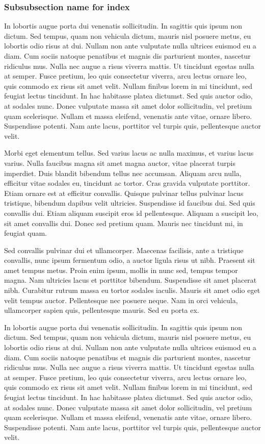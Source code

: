 \subsubsection[Subsubsection name]{Subsubsection name for index}
In lobortis augue porta dui venenatis sollicitudin. In sagittis quis ipsum non dictum. Sed tempus, quam non vehicula dictum, mauris nisl posuere metus, eu lobortis odio risus at dui. Nullam non ante vulputate nulla ultrices euismod eu a diam. Cum sociis natoque penatibus et magnis dis parturient montes, nascetur ridiculus mus. Nulla nec augue a risus viverra mattis. Ut tincidunt egestas nulla at semper. Fusce pretium, leo quis consectetur viverra, arcu lectus ornare leo, quis commodo ex risus sit amet velit. Nullam finibus lorem in mi tincidunt, sed feugiat lectus tincidunt. In hac habitasse platea dictumst. Sed quis auctor odio, at sodales nunc. Donec vulputate massa sit amet dolor sollicitudin, vel pretium quam scelerisque. Nullam et massa eleifend, venenatis ante vitae, ornare libero. Suspendisse potenti. Nam ante lacus, porttitor vel turpis quis, pellentesque auctor velit.

Morbi eget elementum tellus. Sed varius lacus ac nulla maximus, et varius lacus varius. Nulla faucibus magna sit amet magna auctor, vitae placerat turpis imperdiet. Duis blandit bibendum tellus nec accumsan. Aliquam arcu nulla, efficitur vitae sodales eu, tincidunt ac tortor. Cras gravida vulputate porttitor. Etiam ornare est at efficitur convallis. Quisque pulvinar tellus pulvinar lacus tristique, bibendum dapibus velit ultricies. Suspendisse id faucibus dui. Sed quis convallis dui. Etiam aliquam suscipit eros id pellentesque. Aliquam a suscipit leo, sit amet convallis dui. Donec sed pretium quam. Mauris nec tincidunt mi, in feugiat quam.

Sed convallis pulvinar dui et ullamcorper. Maecenas facilisis, ante a tristique convallis, nunc ipsum fermentum odio, a auctor ligula risus ut nibh. Praesent sit amet tempus metus. Proin enim ipsum, mollis in nunc sed, tempus tempor magna. Nam ultricies lacus et porttitor bibendum. Suspendisse sit amet placerat nibh. Curabitur rutrum massa eu tortor sodales iaculis. Mauris sit amet odio eget velit tempus auctor. Pellentesque nec posuere neque. Nam in orci vehicula, ullamcorper sapien quis, pellentesque mauris. Sed eu porta ex. 

In lobortis augue porta dui venenatis sollicitudin. In sagittis quis ipsum non dictum. Sed tempus, quam non vehicula dictum, mauris nisl posuere metus, eu lobortis odio risus at dui. Nullam non ante vulputate nulla ultrices euismod eu a diam. Cum sociis natoque penatibus et magnis dis parturient montes, nascetur ridiculus mus. Nulla nec augue a risus viverra mattis. Ut tincidunt egestas nulla at semper. Fusce pretium, leo quis consectetur viverra, arcu lectus ornare leo, quis commodo ex risus sit amet velit. Nullam finibus lorem in mi tincidunt, sed feugiat lectus tincidunt. In hac habitasse platea dictumst. Sed quis auctor odio, at sodales nunc. Donec vulputate massa sit amet dolor sollicitudin, vel pretium quam scelerisque. Nullam et massa eleifend, venenatis ante vitae, ornare libero. Suspendisse potenti. Nam ante lacus, porttitor vel turpis quis, pellentesque auctor velit.

